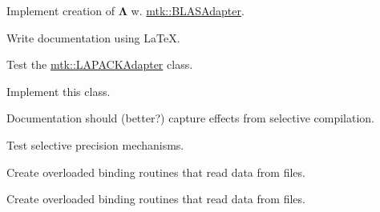 \begin{DoxyRefList}
Implement creation of $ \mathbf{\Lambda}$ w. \hyperlink{classmtk_1_1BLASAdapter}{mtk\+::\+B\+L\+A\+S\+Adapter}.  
\item[\label{todo__todo000020}%
\hypertarget{todo__todo000020}{}%
File \hyperlink{mtk__lapack__adapter_8cc}{mtk\+\_\+lapack\+\_\+adapter.cc} ]Write documentation using La\+Te\+X. 
\item[\label{todo__todo000026}%
\hypertarget{todo__todo000026}{}%
File \hyperlink{mtk__lapack__adapter__test_8cc}{mtk\+\_\+lapack\+\_\+adapter\+\_\+test.cc} ]Test the \hyperlink{classmtk_1_1LAPACKAdapter}{mtk\+::\+L\+A\+P\+A\+C\+K\+Adapter} class.  
\item[\label{todo__todo000003}%
\hypertarget{todo__todo000003}{}%
File \hyperlink{mtk__quad__1d_8h}{mtk\+\_\+quad\+\_\+1d.h} ]Implement this class.  
\item[\label{todo__todo000004}%
\hypertarget{todo__todo000004}{}%
File \hyperlink{mtk__roots_8h}{mtk\+\_\+roots.h} ]Documentation should (better?) capture effects from selective compilation.

Test selective precision mechanisms.  
\item[\label{todo__todo000006}%
\hypertarget{todo__todo000006}{}%
File \hyperlink{mtk__uni__stg__grid__1d_8h}{mtk\+\_\+uni\+\_\+stg\+\_\+grid\+\_\+1d.h} ]Create overloaded binding routines that read data from files.  
\item[\label{todo__todo000009}%
\hypertarget{todo__todo000009}{}%
File \hyperlink{mtk__uni__stg__grid__2d_8h}{mtk\+\_\+uni\+\_\+stg\+\_\+grid\+\_\+2d.h} ]Create overloaded binding routines that read data from files. 
\end{DoxyRefList}